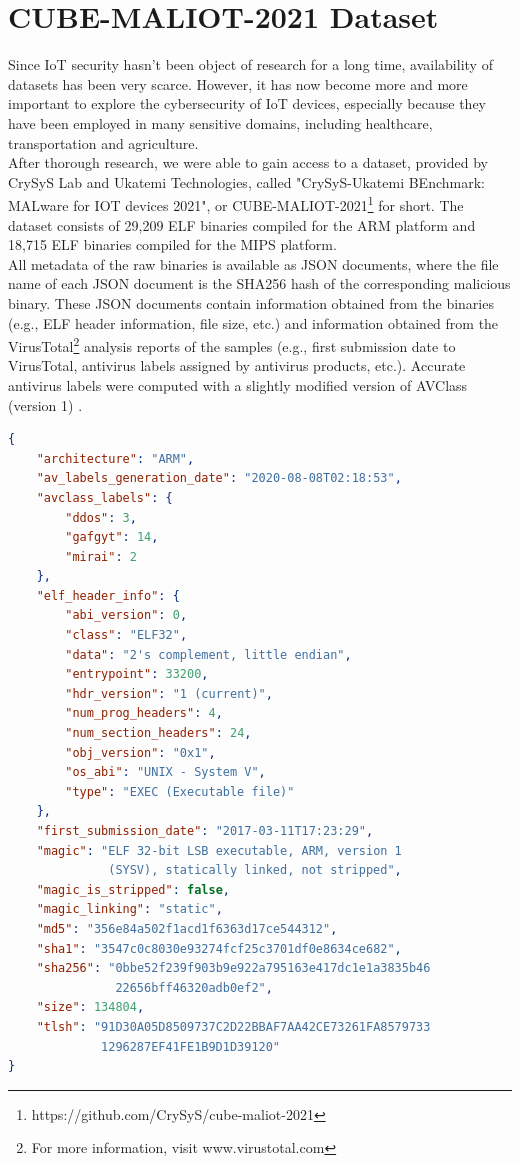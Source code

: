 \section{CUBE-MALIOT-2021 Dataset}
Since IoT security hasn't been object of research for a long time, availability of datasets has been very scarce. However, it has now become more and more important to explore the cybersecurity of IoT devices, especially because they have been employed in many sensitive domains, including healthcare, transportation and agriculture. \\
After thorough research, we were able to gain access to a dataset, provided by CrySyS Lab and Ukatemi Technologies, called "CrySyS-Ukatemi BEnchmark: MALware for IOT devices 2021", or CUBE-MALIOT-2021\footnote{https://github.com/CrySyS/cube-maliot-2021} for short. The dataset consists of 29,209 ELF binaries compiled for the ARM platform and 18,715 ELF binaries compiled for the MIPS platform. \\
All metadata of the raw binaries is available as JSON documents, where the file name of each JSON document is the SHA256 hash of the corresponding malicious binary. These JSON documents contain information obtained from the binaries (e.g., ELF header information, file size, etc.) and information obtained from the VirusTotal\footnote{For more information, visit www.virustotal.com} analysis reports of the samples (e.g., first submission date to VirusTotal, antivirus labels assigned by antivirus products, etc.). Accurate antivirus labels were computed with a slightly modified version of AVClass (version 1) \cite{sebastian2016avclass}. \\

\begin{center}
\begin{lstlisting}[caption={Metadata of a Gafgyt ARM malware sample.}, captionpos=b, label={code:JSON}, language=json, xleftmargin=.03\textwidth, xrightmargin=.03\textwidth]
{
    "architecture": "ARM",
    "av_labels_generation_date": "2020-08-08T02:18:53",
    "avclass_labels": {
        "ddos": 3,
        "gafgyt": 14,
        "mirai": 2
    },
    "elf_header_info": {
        "abi_version": 0,
        "class": "ELF32",
        "data": "2's complement, little endian",
        "entrypoint": 33200,
        "hdr_version": "1 (current)",
        "num_prog_headers": 4,
        "num_section_headers": 24,
        "obj_version": "0x1",
        "os_abi": "UNIX - System V",
        "type": "EXEC (Executable file)"
    },
    "first_submission_date": "2017-03-11T17:23:29",
    "magic": "ELF 32-bit LSB executable, ARM, version 1 
              (SYSV), statically linked, not stripped",
    "magic_is_stripped": false,
    "magic_linking": "static",
    "md5": "356e84a502f1acd1f6363d17ce544312",
    "sha1": "3547c0c8030e93274fcf25c3701df0e8634ce682",
    "sha256": "0bbe52f239f903b9e922a795163e417dc1e1a3835b46
               22656bff46320adb0ef2",
    "size": 134804,
    "tlsh": "91D30A05D8509737C2D22BBAF7AA42CE73261FA8579733
             1296287EF41FE1B9D1D39120"
}
\end{lstlisting}
\end{center}

